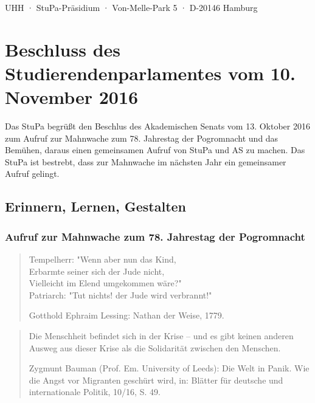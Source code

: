 \documentclass[ngerman,headheight=70pt]{scrartcl}
\begin{document}
    UHH · StuPa-Präsidium · Von-Melle-Park 5 · D-20146 Hamburg

    \section*{Beschluss des Studierendenparlamentes vom 10. November 2016}

    Das StuPa begrüßt den Beschlus des Akademischen Senats vom 13. Oktober
    2016 zum Aufruf zur Mahnwache zum 78. Jahrestag der Pogromnacht und das
    Bemühen, daraus einen gemeinsamen Aufruf von StuPa und AS zu machen. Das
    StuPa ist bestrebt, dass zur Mahnwache im nächsten Jahr ein gemeinsamer
    Aufruf gelingt.

    \subsection*{Erinnern, Lernen, Gestalten}
    \subsubsection*{Aufruf zur Mahnwache zum 78. Jahrestag der Pogromnacht}

    \blockquote[Gotthold Ephraim Lessing: Nathan der Weise, 1779.]{
        Tempelherr: "Wenn aber nun das Kind, \\
        Erbarmte seiner sich der Jude nicht, \\
        Vielleicht im Elend umgekommen wäre?" \\
        Patriarch: "Tut nichts! der Jude wird verbrannt!"\\
    }

    \blockquote[Zygmunt Bauman (Prof. Em. University of Leeds): Die Welt in Panik. Wie die Angst vor Migranten geschürt wird, in: Blätter für deutsche und internationale Politik, 10/16, S. 49.]{
        Die Menschheit befindet sich in der Krise –
        und es gibt keinen anderen Ausweg aus dieser Krise als die
        Solidarität zwischen den Menschen.
    }
\end{document}

